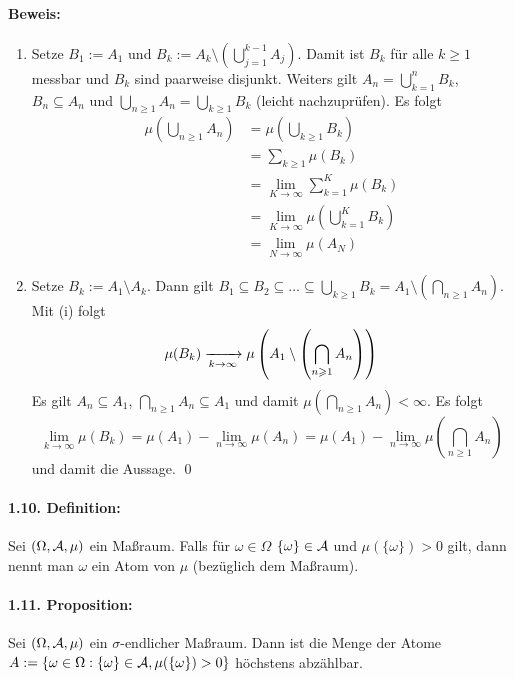 \documentclass[12pt]{report}
\begin{document}
\paragraph{Beweis:}
\begin{enumerate}[label=(\roman*)]
    \item Setze $B_1:=A_1$ und $B_k:=A_k\setminus\left(\bigcup_{j=1}^{k-1}A_j\right)$. Damit ist $B_k$ f\"ur alle $k\geq1$ messbar und $B_k$ sind paarweise disjunkt. Weiters gilt $A_n=\bigcup_{k=1}^n B_k$, $B_n\subseteq A_n$ und $\bigcup_{n\geq1}A_n=\bigcup_{k\geq1}B_k$ (leicht nachzupr\"ufen). Es folgt
    \begin{align*}
        \mu\left(\bigcup_{n\geq1}A_n\right)&=\mu\left(\bigcup_{k\geq1}B_k\right)\\
        &=\sum_{k\geq1}\mu(B_k)\\
        &=\lim_{K\to\infty}\sum_{k=1}^K\mu(B_k)\\
        &=\lim_{K\to\infty}\mu\left(\bigcup_{k=1}^K B_k\right)\\
        &=\lim_{N\to\infty}\mu(A_N)
    \end{align*}
    \item Setze $B_k:=A_1\setminus A_k$. Dann gilt $B_1\subseteq B_2\subseteq\hdots\subseteq\bigcup_{k\geq1}B_k=A_1\setminus\left(\bigcap_{n\geq1}A_n\right)$. Mit (i) folgt
    $$\mu(B_k)\nto{}{k\to\infty}\mu\left(A_1\setminus\left(\bigcap_{n\geq1}A_n\right)\right)$$
    Es gilt $A_n\subseteq A_1$, $\bigcap_{n\geq1}A_n\subseteq A_1$ und damit $\mu\left(\bigcap_{n\geq1}A_n\right)<\infty$. Es folgt 
    $$\lim_{k\to\infty}\mu(B_k)=\mu(A_1)-\lim_{n\to\infty}\mu(A_n)=\mu(A_1)-\lim_{n\to\infty}\mu\left(\bigcap_{n\geq1}A_n\right)$$
    und damit die Aussage. \qed
\end{enumerate}

\paragraph{1.10. Definition:}Sei $(\Omega,\mathcal{A},\mu)$ ein Ma\ss{}raum. Falls f\"ur $\omega\in\Omega$ $\{\omega\}\in\mathcal{A}$ und $\mu(\{\omega\})>0$ gilt, dann nennt man $\omega$ ein Atom von $\mu$ (bez\"uglich dem Ma\ss{}raum).

\paragraph{1.11. Proposition:}Sei $(\Omega,\mathcal{A},\mu)$ ein $\sigma$-endlicher Ma\ss{}raum. Dann ist die Menge der Atome $A:=\{\omega\in\Omega:\{\omega\}\in\mathcal{A},\mu(\{\omega\})>0\}$ h\"ochstens abz\"ahlbar.
\end{document}
